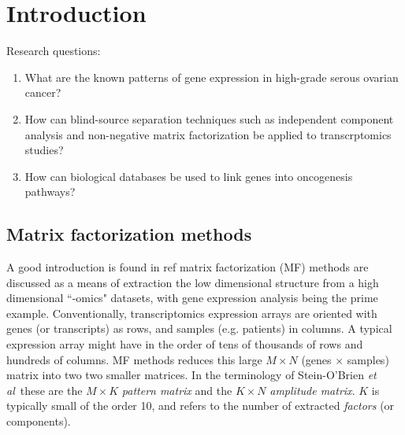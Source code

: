 \documentclass[tikz, 12pt,a4paper,oneside,fleqn]{article}
\newcommand{\etal}{{\em et al\/}}
\begin{document}
\newpage
\setcounter{page}{1}



\section{Introduction}

Research questions:  
\begin{enumerate}
\item What are the known patterns of gene expression in high-grade serous ovarian cancer?
\item How can blind-source separation techniques such as independent component analysis and non-negative matrix factorization be applied to transcrptomics studies?
\item How can biological databases be used to link genes into oncogenesis pathways?
\end{enumerate}

\subsection{Matrix factorization methods}
\label{sec-matrix-factorization-intro}

A good introduction is found in ref \cite{Stein-OBrien2018} matrix factorization (MF) methods are discussed as a means of extraction the low dimensional structure from a high dimensional ``-omics" datasets, with gene expression analysis being the prime example.  
Conventionally, transcriptomics expression arrays are oriented with genes (or transcripts) as rows, and samples (e.g. patients) in columns.   
A typical expression array might have in the order of tens of thousands of rows and hundreds of columns.  
MF methods reduces this large $M \times N$ (genes $\times$ samples) matrix into two two smaller matrices.
In the terminology of Stein-O'Brien \etal\ these are the $M \times K$ \emph{pattern matrix} and the $K \times N$ \emph{amplitude matrix}.  $K$ is typically small of the order 10, and refers to the number of extracted \emph{factors} (or components). 
\end{document}
